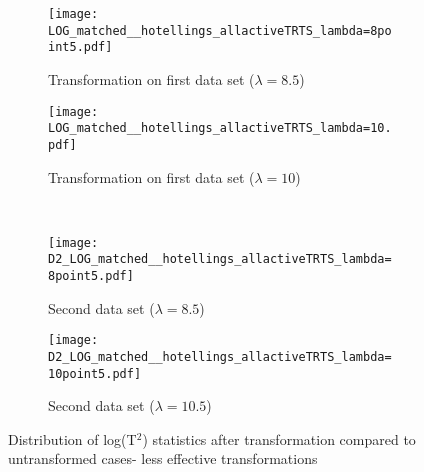 \documentclass[11pt]{article}
\begin{document}
\clearpage
\begin{figure}[ht!]
  \begin{subfigure}[b]{0.5\linewidth}
  \centering
\texttt{[image: LOG\_matched\_\_hotellings\_allactiveTRTS\_lambda=8point5.pdf]}
\caption*{Transformation on first data set ($\lambda =8.5$)}
\vspace{1ex}
 \end{subfigure}%
  \begin{subfigure}[b]{0.5\linewidth}
  \centering
\texttt{[image: LOG\_matched\_\_hotellings\_allactiveTRTS\_lambda=10.pdf]}
\caption*{Transformation on first data set ($\lambda =10$)}
\vspace{1ex}
 \end{subfigure}%
 \\
   \begin{subfigure}[b]{0.5\linewidth}
  \centering
\texttt{[image: D2\_LOG\_matched\_\_hotellings\_allactiveTRTS\_lambda=8point5.pdf]}
\caption*{Second data set ($\lambda =8.5$)}
\vspace{1ex}
 \end{subfigure}%
  \begin{subfigure}[b]{0.5\linewidth}
  \centering
\texttt{[image: D2\_LOG\_matched\_\_hotellings\_allactiveTRTS\_lambda=10point5.pdf]}
\caption*{Second data set ($\lambda =10.5$)}
\vspace{1ex}
 \end{subfigure}%
\caption{Distribution of log(T$^2$) statistics after transformation compared to untransformed cases- less effective transformations}
\label{distt8510log}
\end{figure}
\end{document}
